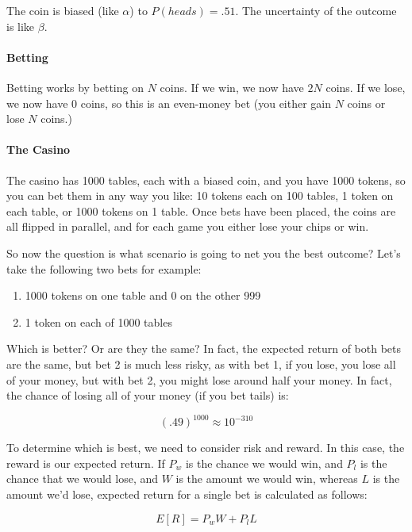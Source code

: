 \noindent The coin is biased (like $\alpha$) to $P(heads) = .51$. The uncertainty of the outcome is like $\beta$.

\paragraph{Betting} Betting works by betting on $N$ coins. If we win, we now have $2N$ coins. If we lose, we now have $0$ coins, so this is an even-money bet (you either gain $N$ coins or lose $N$ coins.)

\paragraph{The Casino} The casino has 1000 tables, each with a biased coin, and you have 1000 tokens, so you can bet them in any way you like: 10 tokens each on 100 tables, 1 token on each table, or 1000 tokens on 1 table. Once bets have been placed, the coins are all flipped in parallel, and for each game you either lose your chips or win.

\noindent So now the question is what scenario is going to net you the best outcome? Let's take the following two bets for example:

\begin{enumerate}
\item 1000 tokens on one table and 0 on the other 999
\item 1 token on each of 1000 tables
\end{enumerate}

\noindent Which is better? Or are they the same? In fact, the expected return of both bets are the same, but bet 2 is much less risky, as with bet 1, if you lose, you lose all of your money, but with bet 2, you might lose around half your money. In fact, the chance of losing all of your money (if you bet tails) is:

\begin{equation*}
(.49)^{1000} \approx 10^{-310}
\end{equation*}

\noindent To determine which is best, we need to consider risk and reward. In this case, the reward is our expected return. If $P_w$ is the chance we would win, and $P_l$ is the chance that we would lose, and $W$ is the amount we would win, whereas $L$ is the amount we'd lose, expected return for a single bet is calculated as follows:

\begin{equation*}
	E[R] = P_wW + P_lL
\end{equation*}


